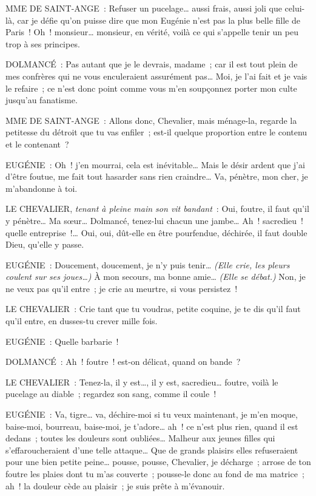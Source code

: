 \documentclass[french,twoside]{book} %
\begin{document}
MME DE SAINT-ANGE : Refuser un pucelage… aussi frais, aussi joli que celui-là, car je défie qu’on puisse dire que mon Eugénie n’est pas la plus belle fille de Paris ! Oh ! monsieur… monsieur, en vérité, voilà ce qui s’appelle tenir un peu trop à ses principes.\par
DOLMANCÉ : Pas autant que je le devrais, madame ; car il est tout plein de mes confrères qui ne vous enculeraient assurément pas… Moi, je l’ai fait et je vais le refaire ; ce n’est donc point comme vous m’en soupçonnez porter mon culte jusqu’au fanatisme.\par
MME DE SAINT-ANGE : Allons donc, Chevalier, mais ménage-la, regarde la petitesse du détroit que tu vas enfiler ; est-il quelque proportion entre le contenu et le contenant ?\par
EUGÉNIE : Oh ! j’en mourrai, cela est inévitable… Mais le désir ardent que j’ai d’être foutue, me fait tout hasarder sans rien craindre… Va, pénètre, mon cher, je m’abandonne à toi.\par
LE CHEVALIER, {\itshape tenant à pleine main son vit bandant} : Oui, foutre, il faut qu’il y pénètre… Ma sœur… Dolmancé, tenez-lui chacun une jambe… Ah ! sacredieu ! quelle entreprise !… Oui, oui, dût-elle en être pourfendue, déchirée, il faut double Dieu, qu’elle y passe.\par
EUGÉNIE : Doucement, doucement, je n’y puis tenir… {\itshape (Elle crie, les pleurs coulent sur ses joues…)} À mon secours, ma bonne amie… {\itshape (Elle se débat.)} Non, je ne veux pas qu’il entre ; je crie au meurtre, si vous persistez !\par
LE CHEVALIER : Crie tant que tu voudras, petite coquine, je te dis qu’il faut qu’il entre, en dusses-tu crever mille fois.\par
EUGÉNIE : Quelle barbarie !\par
DOLMANCÉ : Ah ! foutre ! est-on délicat, quand on bande ?\par
LE CHEVALIER : Tenez-la, il y est…, il y est, sacredieu… foutre, voilà le pucelage au diable ; regardez son sang, comme il coule !\par
EUGÉNIE : Va, tigre… va, déchire-moi si tu veux maintenant, je m’en moque, baise-moi, bourreau, baise-moi, je t’adore… ah ! ce n’est plus rien, quand il est dedans ; toutes les douleurs sont oubliées… Malheur aux jeunes filles qui s’effaroucheraient d’une telle attaque… Que de grands plaisirs elles refuseraient pour une bien petite peine… pousse, pousse, Chevalier, je décharge ; arrose de ton foutre les plaies dont tu m’as couverte ; pousse-le donc au fond de ma matrice ; ah ! la douleur cède au plaisir ; je suis prête à m’évanouir.\par
\end{document}
